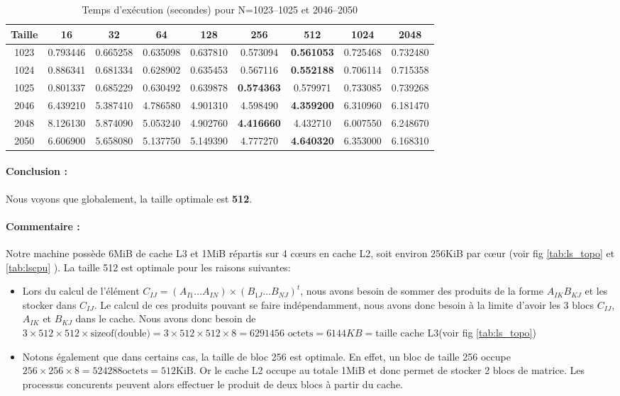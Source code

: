 \documentclass[a4paper,13pt]{book}
\begin{document}
\begin{table}[ht]
    \centering
    \caption{Temps d'exécution (secondes) pour N=1023--1025 et 2046--2050}
    \label{tab:threads1}
    \begin{tabular}{|c|c|c|c|c|c|c|c|c|}\hline
    Taille & 16 & 32 & 64 & 128 & 256 & 512 & 1024 & 2048 \\\hline
    1023 & 0.793446 & 0.665258 & 0.635098 & 0.637810 & 0.573094 & \textbf{0.561053} & 0.725468 & 0.732480 \\\hline
    1024 & 0.886341 & 0.681334 & 0.628902 & 0.635453 & 0.567116 & \textbf{0.552188} & 0.706114 & 0.715358 \\\hline
    1025 & 0.801337 & 0.685229 & 0.630492 & 0.639878 & \textbf{0.574363} & 0.579971 & 0.733085 & 0.739268 \\\hline
    2046 & 6.439210 & 5.387410 & 4.786580 & 4.901310 & 4.598490 & \textbf{4.359200} & 6.310960 & 6.181470 \\\hline
    2048 & 8.126130 & 5.874090 & 5.053240 & 4.902760 & \textbf{4.416660} & 4.432710 & 6.007550 & 6.248670 \\\hline
    2050 & 6.606900 & 5.658080 & 5.137750 & 5.149390 & 4.777270 & \textbf{4.640320} & 6.353000 & 6.168310 \\\hline
    \end{tabular}
\end{table}

\paragraph{Conclusion : }Nous voyons que globalement, la taille optimale est \textbf{512}.
\paragraph{Commentaire : }
Notre machine possède 6MiB de cache L3 et 1MiB répartis sur 4 cœurs en cache L2, soit environ 256KiB par cœur (voir fig \ref{tab:ls_topo} et \ref{tab:lscpu} ). La taille 512 est optimale pour les raisons suivantes:
\begin{itemize}
    \item Lors du calcul de l'élément $C_{IJ} = (A_{I1}\dots A_{IN})\times (B_{1J}\dots B_{NJ})^t$, nous avons besoin de sommer des produits de la forme $A_{IK}B_{KJ}$ et les stocker dans $C_{IJ}$. Le calcul de ces produits pouvant se faire indépendamment, nous avons donc besoin à la limite d'avoir les 3 blocs $C_{IJ}$, $A_{IK}$ et $B_{KJ}$ dans le cache. Nous avons donc besoin de $3\times 512 \times 512 \times \text{sizeof(double)} = 3 \times 512 \times 512 \times 8 = 6291456\text{ octets} = 6144 KB = \text{taille cache L3} $(voir fig \ref{tab:ls_topo})
    \item Notons également que dans certains cas, la taille de bloc 256 est optimale. En effet, un bloc de taille 256 occupe $256\times 256 \times 8 = 524288 \text{octets} = 512\text{KiB}$. Or le cache L2 occupe au totale 1MiB et donc permet de stocker 2 blocs de matrice. Les processus concurents peuvent alors effectuer le produit de deux blocs à partir du cache.
 \end{itemize}
\end{document}
